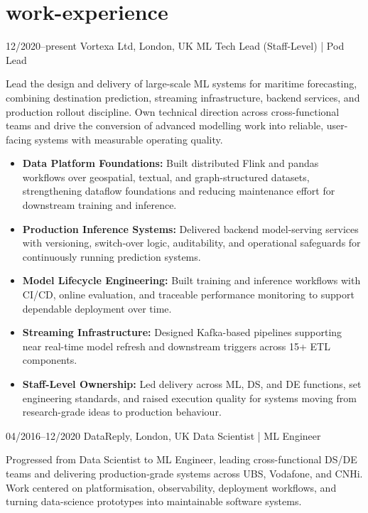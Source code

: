 \documentclass[]{../../friggeri-cv}
\begin{document}
\section{work-experience}
\begin{entrylist}
	\entry
	{\footnotesize 12/2020–present}
	{Vortexa Ltd, London, UK}
	{ML Tech Lead (Staff-Level) | Pod Lead}
	{
    	{\small
	    \setlength{\parindent}{-1.5em}
    	\setlength{\leftskip}{-1.5em}
		    Lead the design and delivery of large-scale ML systems for maritime forecasting, combining destination prediction, streaming infrastructure, backend services, and production rollout discipline. Own technical direction across cross-functional teams and drive the conversion of advanced modelling work into reliable, user-facing systems with measurable operating quality.

    	}
	    \begin{itemize}[left=-1.5em]
    	    \item \footnotesize\textbf{Data Platform Foundations:} Built distributed Flink and pandas workflows over geospatial, textual, and graph-structured datasets, strengthening dataflow foundations and reducing maintenance effort for downstream training and inference.
	        \item \footnotesize\textbf{Production Inference Systems:} Delivered backend model-serving services with versioning, switch-over logic, auditability, and operational safeguards for continuously running prediction systems.
		        \item \footnotesize\textbf{Model Lifecycle Engineering:} Built training and inference workflows with CI/CD, online evaluation, and traceable performance monitoring to support dependable deployment over time.
	        \item \footnotesize\textbf{Streaming Infrastructure:} Designed Kafka-based pipelines supporting near real-time model refresh and downstream triggers across 15+ ETL components.
	        \item \footnotesize\textbf{Staff-Level Ownership:} Led delivery across ML, DS, and DE functions, set engineering standards, and raised execution quality for systems moving from research-grade ideas to production behaviour.
    	\end{itemize}
	}
    \entry
    {\footnotesize 04/2016–12/2020}
    {DataReply, London, UK}
    {Data Scientist | ML Engineer}
    {
        {\small
        \setlength{\parindent}{-1.5em}
        \setlength{\leftskip}{-1.5em}
        Progressed from Data Scientist to ML Engineer, leading cross-functional DS/DE teams and delivering production-grade systems across UBS, Vodafone, and CNHi. Work centered on platformisation, observability, deployment workflows, and turning data-science prototypes into maintainable software systems.

}}
\end{entrylist}
\end{document}
